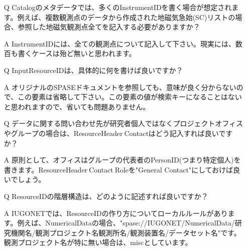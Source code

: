 \begin{screen}
\begin{itemize}
\item[\stepcounter{qq}Q\theqq] Catalogのメタデータでは、多くのInstrumentIDを書く場合が想定されます。例えば、複数観測点のデータから作成された地磁気急始(SC)リストの場合、参照した地磁気観測点全てを記入する必要がありますか？
\item[\stepcounter{aa}A\theaa] InstrumentIDには、全ての観測点について記入して下さい。現実には、数百も書くケースは殆ど無いと思われます。
\end{itemize}
\end{screen}

\begin{screen}
\begin{itemize}
\item[\stepcounter{qq}Q\theqq] InputResourceIDは、具体的に何を書けば良いですか？
\item[\stepcounter{aa}A\theaa] オリジナルのSPASEドキュメントを参照しても、意味が良く分からないので、この要素は省略して下さい。この要素の値が検索キーになることはないと思われますので、省いても問題ありません。
\end{itemize}
\end{screen}

\begin{screen}
\begin{itemize}
\item[\stepcounter{qq}Q\theqq] データに関する問い合わせ先が研究者個人ではなくプロジェクトオフィスやグループの場合は、ResourceHeader$\>$Contactはどう記入すれば良いですか？
\item[\stepcounter{aa}A\theaa] 原則として、オフィスはグループの代表者のPersonID(つまり特定個人)を書きます。ResourceHeader$\>$Contact$\>$Roleを"General Contact"にしておけば良いでしょう。
\end{itemize}
\end{screen}

\begin{screen}
\begin{itemize}
\item[\stepcounter{qq}Q\theqq] ResourceIDの階層構造は、どのように記述すれば良いですか？
\item[\stepcounter{aa}A\theaa] IUGONETでは、ResourceIDの作り方についてローカルルールがあります。例えば、NumericalDataの場合、"spase://IUGONET/NumericalData/研究機関名/観測プロジェクト名観測所名/観測装置名/データセット名"です。観測プロジェクト名が特に無い場合は、miscとしています。
\end{itemize}
\end{screen}

